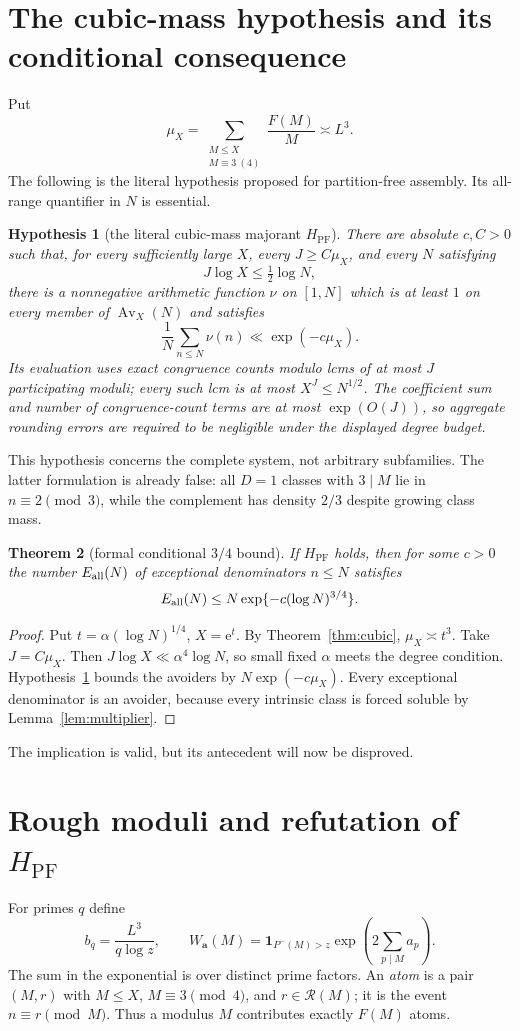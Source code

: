 \documentclass[10pt,reqno]{amsart}
\newtheorem{theorem}{Theorem}[section]
\newtheorem{hypothesis}[theorem]{Hypothesis}
\theoremstyle{definition}
\newcommand{\Rcal}{\mathscr R}
\newcommand{\Av}{\operatorname {Av}}
\newcommand{\e}{\mathrm e}
\newcommand{\1}{\mathbf 1}
\newcommand{\PF}{H_{\mathrm{PF}}}
\begin{document}
\section{The cubic-mass hypothesis and its conditional consequence}\label{sec:hpf}
Put
\[
 \mu_X=\sum_{\substack{M\leq X\\M\equiv3\ (4)}}\frac{F(M)}M\asymp L^3.
\]
The following is the literal hypothesis proposed for partition-free assembly.  Its all-range quantifier in $N$ is essential.

\begin{hypothesis}[the literal cubic-mass majorant $\PF$]\label{hyp:PF}
There are absolute $c,C>0$ such that, for every sufficiently large $X$, every $J\geq C\mu_X$, and every $N$ satisfying
\[
 J\log X\leq\tfrac12\log N,
\]
there is a nonnegative arithmetic function $\nu$ on $[1,N]$ which is at least $1$ on every member of $\Av_X(N)$ and satisfies
\[
 \frac1N\sum_{n\leq N}\nu(n)\ll\exp(-c\mu_X).
\]
Its evaluation uses exact congruence counts modulo lcms of at most $J$ participating moduli; every such lcm is at most $X^J\leq N^{1/2}$.  The coefficient sum and number of congruence-count terms are at most $\exp(O(J))$, so aggregate rounding errors are required to be negligible under the displayed degree budget.
\end{hypothesis}
This hypothesis concerns the complete system, not arbitrary subfamilies.  The latter formulation is already false: all $D=1$ classes with $3\mid M$ lie in $n\equiv2\pmod3$, while the complement has density $2/3$ despite growing class mass.

\begin{theorem}[formal conditional $3/4$ bound]\label{thm:conditional}
If $\PF$ holds, then for some $c>0$ the number $E_{\rm all}(N)$ of exceptional denominators $n\leq N$ satisfies
\[
 E_{\rm all}(N)\leq N\exp\{-c(\log N)^{3/4}\}.
\]
\end{theorem}
\begin{proof}
Put $t=\alpha(\log N)^{1/4}$, $X=\e^t$.  By Theorem~\ref{thm:cubic}, $\mu_X\asymp t^3$.  Take $J=C\mu_X$.  Then
$J\log X\ll\alpha^4\log N$, so small fixed $\alpha$ meets the degree condition.  Hypothesis~\ref{hyp:PF} bounds the avoiders by $N\exp(-c\mu_X)$.  Every exceptional denominator is an avoider, because every intrinsic class is forced soluble by Lemma~\ref{lem:multiplier}.
\end{proof}
The implication is valid, but its antecedent will now be disproved.

\section{Rough moduli and refutation of \texorpdfstring{$\PF$}{H-PF}}\label{sec:refutation}
For primes $q$ define
\[
 b_q=\frac{L^3}{q\log z},\qquad
 W_{\boldsymbol a}(M)=\1_{P^-(M)>z}
 \exp\!\left(2\sum_{p\mid M}a_p\right).
\]
The sum in the exponential is over distinct prime factors.  An \emph{atom} is a pair $(M,r)$ with $M\leq X$, $M\equiv3\pmod4$, and $r\in\Rcal(M)$; it is the event $n\equiv r\pmod M$.  Thus a modulus $M$ contributes exactly $F(M)$ atoms.
\end{document}
